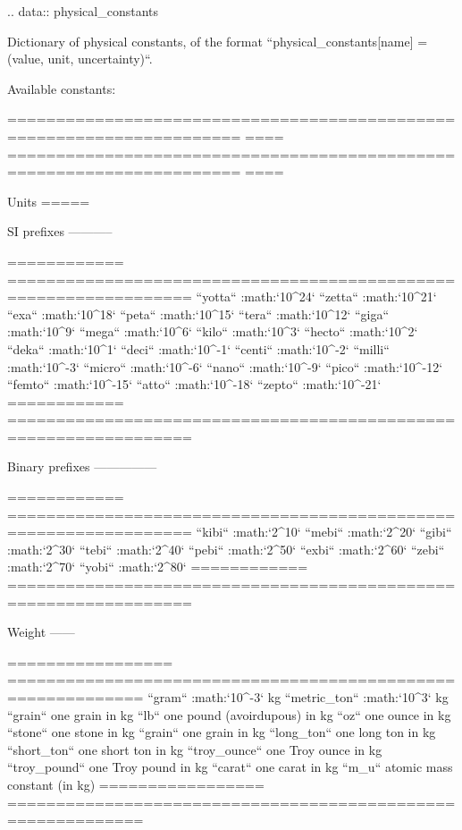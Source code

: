 \begin{DoxyVerb}
.. data:: physical_constants

   Dictionary of physical constants, of the format
   ``physical_constants[name] = (value, unit, uncertainty)``.

Available constants:

======================================================================  ====
======================================================================  ====


Units
=====

SI prefixes
-----------

============  =================================================================
``yotta``     :math:`10^{24}`
``zetta``     :math:`10^{21}`
``exa``       :math:`10^{18}`
``peta``      :math:`10^{15}`
``tera``      :math:`10^{12}`
``giga``      :math:`10^{9}`
``mega``      :math:`10^{6}`
``kilo``      :math:`10^{3}`
``hecto``     :math:`10^{2}`
``deka``      :math:`10^{1}`
``deci``      :math:`10^{-1}`
``centi``     :math:`10^{-2}`
``milli``     :math:`10^{-3}`
``micro``     :math:`10^{-6}`
``nano``      :math:`10^{-9}`
``pico``      :math:`10^{-12}`
``femto``     :math:`10^{-15}`
``atto``      :math:`10^{-18}`
``zepto``     :math:`10^{-21}`
============  =================================================================

Binary prefixes
---------------

============  =================================================================
``kibi``      :math:`2^{10}`
``mebi``      :math:`2^{20}`
``gibi``      :math:`2^{30}`
``tebi``      :math:`2^{40}`
``pebi``      :math:`2^{50}`
``exbi``      :math:`2^{60}`
``zebi``      :math:`2^{70}`
``yobi``      :math:`2^{80}`
============  =================================================================

Weight
------

=================  ============================================================
``gram``           :math:`10^{-3}` kg
``metric_ton``     :math:`10^{3}` kg
``grain``          one grain in kg
``lb``             one pound (avoirdupous) in kg
``oz``             one ounce in kg
``stone``          one stone in kg
``grain``          one grain in kg
``long_ton``       one long ton in kg
``short_ton``      one short ton in kg
``troy_ounce``     one Troy ounce in kg
``troy_pound``     one Troy pound in kg
``carat``          one carat in kg
``m_u``            atomic mass constant (in kg)
=================  ============================================================


\end{DoxyVerb}
